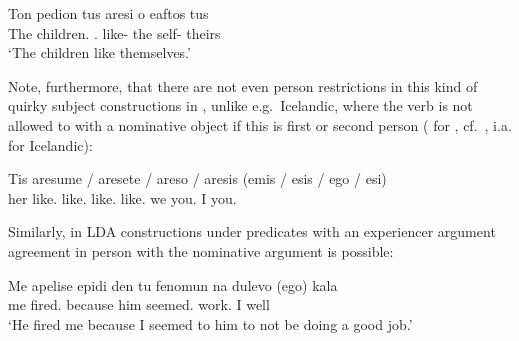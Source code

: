 \documentclass[output=paper]{langsci/langscibook}
\begin{document}
\begin{exe}
\ea%
    \label{ex:key:13.33}
    \gll    Ton pedion tus aresi o   eaftos tus\\
            The children.\Dat{} \Cl.\Dat{} like-\Tsg{} the self-\Nom{} theirs\\
    \glt    ‘The children like themselves.’
\z

Note, furthermore, that there are not even person restrictions in this kind of
quirky subject constructions in , unlike e.g.\ Icelandic, where the verb is
not allowed to  with a nominative object if this is first or second person
(\citealt{Anagnostopoulou2003,Anagnostopoulou2005} for , cf.\
\citealt{Sigurdsson1989,Taraldsen1995}, i.a. for Icelandic):

\ea%
\label{ex:key:13.34}
    \ea {}
    \sn
	\gll  Tis aresume / aresete / areso  / aresis    (emis / esis / ego / esi)\\
    her like.\Fpl{} {} like.\Spl{} {} like.\Fsg{} {} like.\Ssg{} \hphantom{(}we {} you.\Pl{} {} I {} you.\Sg{}\\
    \glt
    \ex {}
    \z
\z

Similarly, in \gls{LDA} constructions under  predicates with an
experiencer argument agreement in person with the nominative argument is
possible:

\ea%
\label{ex:key:13.35}
    \sn
    \gll  Me apelise epidi den tu fenomun na dulevo  (ego)  kala\\
    me fired.\Tsg{} because \Neg{} him seemed.\Fsg{} \Sbjv{} work.\Fsg{} \hphantom{(}I well\\
    \glt  ‘He fired me because I seemed to him to not be doing a good job.’
\z

\ea%
    \label{ex:key:13.36}
    \z
\z


\end{exe}
\end{document}
